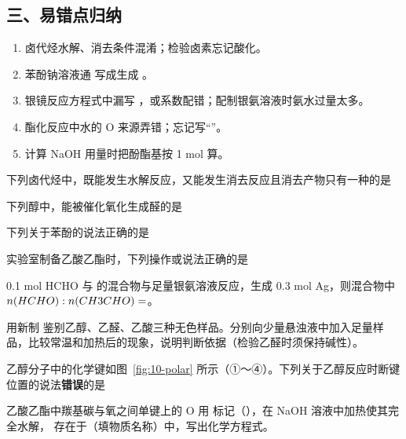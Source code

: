 \subsection*{三、易错点归纳}
\begin{enumerate}
\item 卤代烃水解、消去条件混淆；检验卤素忘记酸化。
\item 苯酚钠溶液通  写成生成 。
\item 银镜反应方程式中漏写 ，或系数配错；配制银氨溶液时氨水过量太多。
\item 酯化反应中水的 O 来源弄错；忘记写“\ce{<=>}”。
\item 计算 NaOH 用量时把酚酯基按 1 mol 算。
\end{enumerate}

\begin{xiti}[start=1]
\item 下列卤代烃中，既能发生水解反应，又能发生消去反应且消去产物只有一种的是\xz
{}

\item 下列醇中，能被催化氧化生成醛的是\xz
{}

\item 下列关于苯酚的说法正确的是\xz
{}

\item 实验室制备乙酸乙酯时，下列操作或说法正确的是\xz
{}

\item 0.1 mol HCHO 与  的混合物与足量银氨溶液反应，生成 0.3 mol Ag，则混合物中 $n(HCHO):n(CH3CHO)=$\tk。

\item 用新制  鉴别乙醇、乙醛、乙酸三种无色样品。分别向少量悬浊液中加入足量样品，比较常温和加热后的现象，说明判断依据（检验乙醛时须保持碱性）。

\item 乙醇分子中的化学键如图~\ref{fig:10-polar} 所示（①～④）。下列关于乙醇反应时断键位置的说法\textbf{错误}的是\xz
{}

\item 乙酸乙酯中羰基碳与氧之间单键上的 O 用  标记（），在 NaOH 溶液中加热使其完全水解， 存在于\tk（填物质名称）中，写出化学方程式。
\end{xiti}

